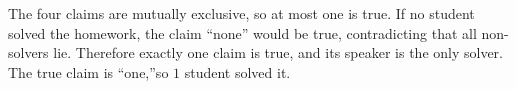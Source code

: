 The four claims are mutually exclusive, so at most one is true. If no student solved the homework, the claim ``none'' would be true, contradicting that all non-solvers lie. Therefore exactly one claim is true, and its speaker is the only solver. The true claim is ``one,''so $\boxed1$ student solved it.
